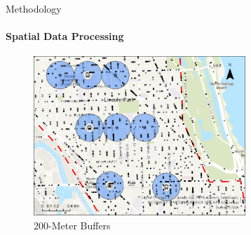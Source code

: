 \documentclass{beamer}
\begin{document}

\begin{frame}{Methodology}
\framesubtitle{Spatial Data Processing}

\begin{figure}
    \centering
    \includegraphics[width=8cm]{figures/circular_zone.pdf}
    \caption{200-Meter Buffers}
    \label{fig:circular_zone}
\end{figure}

\end{frame}

\end{document}
